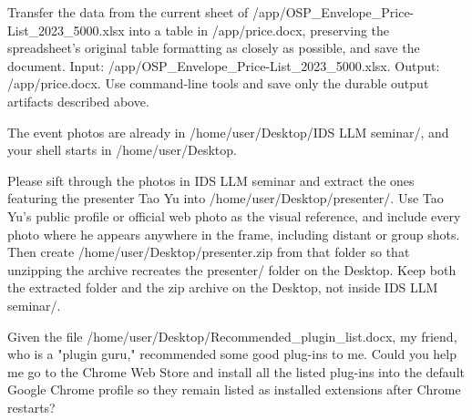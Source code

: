 \begin{instructionbox}
Transfer the data from the current sheet of \textasciigrave{}/app/OSP\_Envelope\_Price-List\_2023\_5000.xlsx\textasciigrave{} into a table in \textasciigrave{}/app/price.docx\textasciigrave{}, preserving the spreadsheet's original table formatting as closely as possible, and save the document.
Input: \textasciigrave{}/app/OSP\_Envelope\_Price-List\_2023\_5000.xlsx\textasciigrave{}.
Output: \textasciigrave{}/app/price.docx\textasciigrave{}.
Use command-line tools and save only the durable output artifacts described above.
\end{instructionbox}

\begin{instructionbox}
The event photos are already in \textasciigrave{}/home/user/Desktop/IDS LLM seminar/\textasciigrave{}, and your shell starts in \textasciigrave{}/home/user/Desktop\textasciigrave{}.

Please sift through the photos in \textasciigrave{}IDS LLM seminar\textasciigrave{} and extract the ones featuring the presenter Tao Yu into \textasciigrave{}/home/user/Desktop/presenter/\textasciigrave{}. Use Tao Yu's public profile or official web photo as the visual reference, and include every photo where he appears anywhere in the frame, including distant or group shots. Then create \textasciigrave{}/home/user/Desktop/presenter.zip\textasciigrave{} from that folder so that unzipping the archive recreates the \textasciigrave{}presenter/\textasciigrave{} folder on the Desktop. Keep both the extracted folder and the zip archive on the Desktop, not inside \textasciigrave{}IDS LLM seminar/\textasciigrave{}.
\end{instructionbox}

\begin{instructionbox}
Given the file \textasciigrave{}/home/user/Desktop/Recommended\_plugin\_list.docx\textasciigrave{}, my friend, who is a "plugin guru," recommended some good plug-ins to me. Could you help me go to the Chrome Web Store and install all the listed plug-ins into the default Google Chrome profile so they remain listed as installed extensions after Chrome restarts?
\end{instructionbox}

